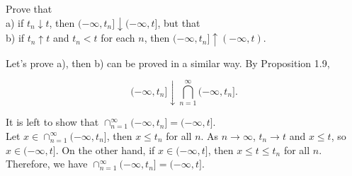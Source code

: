 \begin{exercise}
  Prove that \\
  a) if $t_n\downarrow t$, then $(-\infty, t_n]\downarrow (-\infty, t]$, but that \\
  b) if $t_n\uparrow t$ and $t_n < t$ for each $n$, then $(-\infty, t_n]\uparrow (-\infty, t)$.
\end{exercise}
\begin{solution}
  Let's prove a), then b) can be proved in a similar way. By Proposition 1.9,

  \[(-\infty, t_n] \downarrow \bigcap_{n=1}^\infty (-\infty, t_n] .\]

  It is left to show that $\cap_{n=1}^\infty(-\infty, t_n] = (-\infty, t]$. \\

  Let $x\in\cap_{n=1}^\infty(-\infty, t_n]$, then $x\leq t_n$ for all $n$. As $n\to\infty$, $t_n\to t$ and $x \leq t$, so $x\in (-\infty, t]$. On the other hand, if $x\in(-\infty, t]$, then $x\leq t\leq t_n$ for all $n$. Therefore, we have $\cap_{n=1}^\infty(-\infty, t_n] = (-\infty, t]$.
\end{solution}
